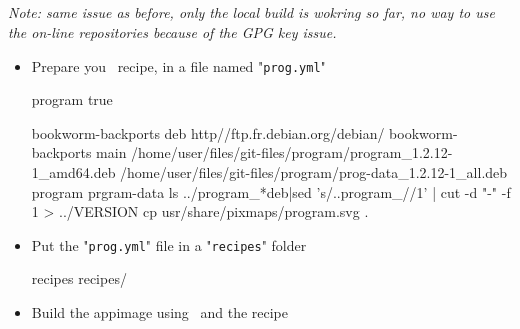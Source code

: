 \newpage
\subsection{\pbuild}

{\em{Note: same issue as before, only the local build is wokring so far, no way to use the on-line repositories because of the GPG key issue.}}

\begin{itemize}
\item Prepare you \pbuild\ recipe, in a file named "\texttt{prog.yml}"
{\footnotesize{
\begin{scripti}
 program
 true

   bookworm-backports
    \bbtt{-} deb http//ftp.fr.debian.org/debian/ bookworm-backports main 
    \bbtt{-} /home/user/files/git-files/program/program_1.2.12-1_amd64.deb
    \bbtt{-} /home/user/files/git-files/program/prog-data_1.2.12-1_all.deb
    \bbtt{-} program
    \bbtt{-} prgram-data
    \bbtt{-} ls ../program_*deb|sed 's/..\/program_//1' | cut -d "-" -f 1 > ../VERSION
    \bbtt{-} cp usr/share/pixmaps/program.svg .
\end{scripti}
}}
\item Put the "\texttt{prog.yml}" file in a "\texttt{recipes}" folder
{\footnotesize{
\begin{scripti}
  recipes
   recipes/
\end{scripti}
}}
\item Build the appimage using \pbuild\ and the recipe
{\footnotesize{
\begin{scripti}
 \pbuild {}
\end{scripti}
}}
\end{itemize}
